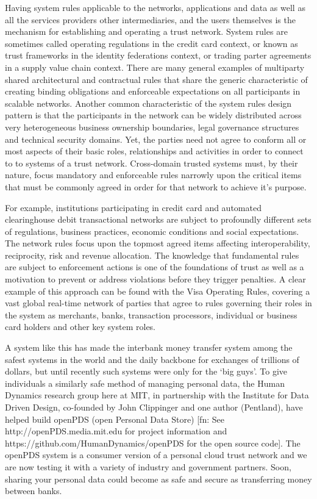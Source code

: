 Having system rules applicable to the networks, applications and data as well as all the services providers other intermediaries, and the users themselves is the mechanism for establishing and operating a trust network.
System rules are sometimes called operating regulations in the credit card context, or known as trust frameworks in the identity federations context, or trading parter agreements in a supply value chain context.
There are many general examples of multiparty shared architectural and contractual rules that share the generic characteristic of creating binding obligations and enforceable expectations on all participants in scalable networks.
Another common characteristic of the system rules design pattern is that the participants in the network can be widely distributed across very heterogeneous business ownership boundaries, legal governance structures and technical security domains.
Yet, the parties need not agree to conform all or most aspects of their basic roles, relationships and activities in order to connect to to systems of a trust network.
Cross-domain trusted systems must, by their nature, focus mandatory and enforceable rules narrowly upon the critical items that must be commonly agreed in order for that network to achieve it's purpose.

For example, institutions participating in credit card and automated clearinghouse debit transactional networks are subject to profoundly different sets of regulations, business practices, economic conditions and social expectations.
The network rules focus upon the topmost agreed items affecting interoperability, reciprocity, risk and revenue allocation.
The knowledge that fundamental rules are subject to enforcement actions is one of the foundations of trust as well as a motivation to prevent or address violations before they trigger penalties. 
A clear example of this approach can be found with the Visa Operating Rules, covering a vast global real-time network of parties that agree to rules governing their roles in the system as merchants, banks, transaction processors, individual or business card holders and other key system roles.

A system like this has made the interbank money transfer system among the safest systems in the world and the daily backbone for exchanges of trillions of dollars, but until recently such systems were only for the `big guys’.
To give individuals a similarly safe method of managing personal data, the Human Dynamics research group here at MIT, in partnership with the Institute for Data Driven Design, co-founded by John Clippinger and one author (Pentland), have helped build openPDS (open Personal Data Store) [fn: See http://openPDS.media.mit.edu for project information and https://github.com/HumanDynamics/openPDS for the open source code].
The openPDS system is a consumer version of a personal cloud trust network and we are now testing it with a variety of industry and government partners.
Soon, sharing your personal data could become as safe and secure as transferring money between banks.

